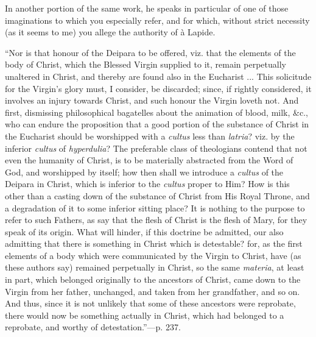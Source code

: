 In another portion of the same work, he speaks in particular of one
of those imaginations to which you especially refer, and for which,
without strict necessity (as it seems to me) you allege the authority of
à Lapide.

``Nor is that honour of the Deipara to be offered, viz. that the
elements of the body of Christ, which the Blessed Virgin supplied to it,
remain perpetually unaltered in Christ, and thereby are found also in
the Eucharist ... This solicitude for the Virgin's glory must, I
consider, be discarded; since, if rightly considered, it involves an
injury towards Christ, and such honour the Virgin loveth not. And first,
dismissing philosophical bagatelles about the animation of blood, milk,
\&c., who can endure the proposition that a good portion of the
substance of Christ in the Eucharist should be worshipped with a \emph{cultus}
less than \emph{latria}? viz. by the inferior \emph{cultus} of \emph{hyperdulia}?
The preferable class of theologians contend that not even the humanity
of Christ, is to be materially abstracted from the Word of God, and
worshipped by itself; how then shall we introduce a \emph{cultus} of the
Deipara in Christ, which is inferior to the \emph{cultus} proper to Him?
How is this other than a casting down of the substance of Christ from
His Royal Throne, and a degradation of it to some inferior sitting
place? It is nothing to the purpose to refer to such Fathers, as say
that the flesh of Christ is the flesh of Mary, for they speak of its
origin. What will hinder, if this doctrine be admitted, our also
admitting that there is something in Christ which is detestable? for, as
the first elements of a body which were communicated by the Virgin to
Christ, have (as these authors say) remained perpetually in Christ, so
the same \emph{materia}, at least in part, which belonged originally to
the ancestors of Christ, came down to the Virgin from her father,
unchanged, and taken from her grandfather, and so on. And thus,
since it is not unlikely that some of these ancestors were reprobate,
there would now be something actually in Christ, which had belonged to a
reprobate, and worthy of detestation.''—p. 237.

